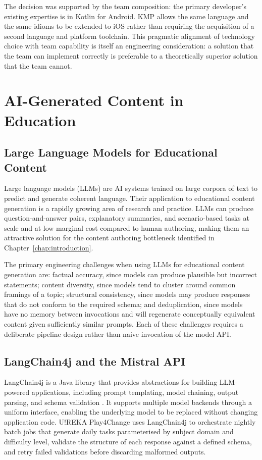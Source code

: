 The decision was supported by the team composition: the primary developer's existing expertise is in Kotlin for Android. KMP allows the same language and the same idioms to be extended to iOS rather than requiring the acquisition of a second language and platform toolchain. This pragmatic alignment of technology choice with team capability is itself an engineering consideration: a solution that the team can implement correctly is preferable to a theoretically superior solution that the team cannot.

\section{AI-Generated Content in Education}
\label{sec:aicontent}

\subsection{Large Language Models for Educational Content}

Large language models (LLMs) are AI systems trained on large corpora of text to predict and generate coherent language. Their application to educational content generation is a rapidly growing area of research and practice. LLMs can produce question-and-answer pairs, explanatory summaries, and scenario-based tasks at scale and at low marginal cost compared to human authoring, making them an attractive solution for the content authoring bottleneck identified in Chapter~\ref{chap:introduction}.

The primary engineering challenges when using LLMs for educational content generation are: factual accuracy, since models can produce plausible but incorrect statements; content diversity, since models tend to cluster around common framings of a topic; structural consistency, since models may produce responses that do not conform to the required schema; and deduplication, since models have no memory between invocations and will regenerate conceptually equivalent content given sufficiently similar prompts. Each of these challenges requires a deliberate pipeline design rather than naive invocation of the model API.

\subsection{LangChain4j and the Mistral API}

LangChain4j is a Java library that provides abstractions for building LLM-powered applications, including prompt templating, model chaining, output parsing, and schema validation \cite{langchain4j2024}. It supports multiple model backends through a uniform interface, enabling the underlying model to be replaced without changing application code. U!REKA Play4Change uses LangChain4j to orchestrate nightly batch jobs that generate daily tasks parameterised by subject domain and difficulty level, validate the structure of each response against a defined schema, and retry failed validations before discarding malformed outputs.

